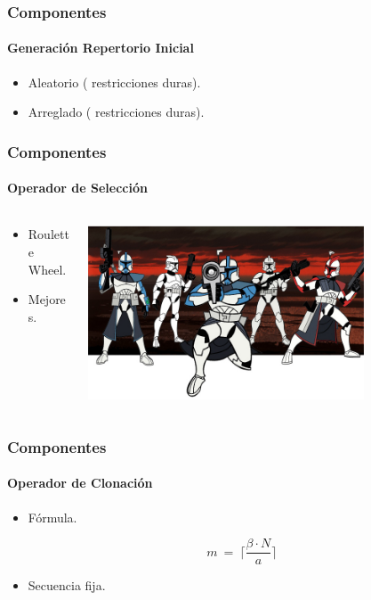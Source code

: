 \frame
{
\frametitle{Componentes}
\framesubtitle{Generación Repertorio Inicial}

\begin{itemize}
    \item Aleatorio ( restricciones duras).
    \item Arreglado ( restricciones duras).
\end{itemize}
}


\frame
{
\frametitle{Componentes}
\framesubtitle{Operador de Selección}
\begin{columns}
    \begin{column}{0.5\textwidth}
        \begin{itemize}
            \item Roulette Wheel.
            \item Mejores.
        \end{itemize}
    \end{column}
    \begin{column}{0.5\textwidth}
        \includegraphics[width=0.75\textwidth]{img/clones}
    \end{column}
\end{columns}
}


\frame
{
\frametitle{Componentes}
\framesubtitle{Operador de Clonación}
\begin{itemize}
    \item Fórmula.

         $$m\ =\ \lceil\frac{\beta \cdot N}{a}\rceil$$
    \item Secuencia fija.
\end{itemize}
}

